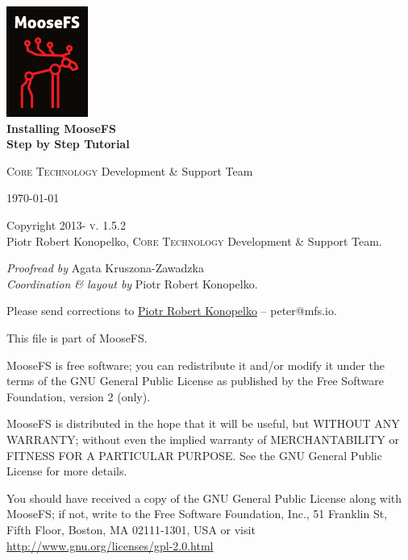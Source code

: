 \documentclass[a4paper,11pt,english]{report}
\newenvironment{copyrightnotice}
	{\begingroup
		\footnotesize
		\setlength{\parindent}{0pt}
		\setlength{\parskip}{\baselineskip}}
	{\endgroup}
\begin{document}
	
	\renewcommand{\labelitemi}{$\bullet$}
	\renewcommand{\labelitemii}{$\circ$}
	\renewcommand{\labelitemiii}{$\bullet$}
	\renewcommand{\labelitemiv}{$\circ$}
	
	\begin{titlepage}
		\begin{center}
			\includegraphics[width=0.2\textwidth]{images/moosefs.png}\\[1cm]
			
			{ \huge \bfseries Installing MooseFS \\
			Step by Step Tutorial \\[0.4cm] }
			

			\textsc{Core Technology} Development \& Support Team
			
			\vfill
			
			{\large \today}
		\end{center}
	\end{titlepage}
	
	
	\begin{copyrightnotice}
		\begin{flushleft}
			Copyright \textcopyright{} 2013-\the\year
			\hfill
			\textsc{v. 1.5.2}\\ %
			
			Piotr Robert Konopelko, \textsc{Core Technology} Development \& Support Team.
			
			\emph{Proofread by}
			Agata Kruszona-Zawadzka \\
			\emph{Coordination \& layout by} Piotr Robert Konopelko.
			
			Please send corrections to \href{mailto:peter@mfs.io}{Piotr Robert Konopelko} --  peter@mfs.io.
			
			\bigskip
			
			This file is part of MooseFS.
			
			MooseFS is free software; you can redistribute it and/or modify
			it under the terms of the GNU General Public License as published by
			the Free Software Foundation, version 2 (only).
			
			MooseFS is distributed in the hope that it will be useful,
			but WITHOUT ANY WARRANTY; without even the implied warranty of
			MERCHANTABILITY or FITNESS FOR A PARTICULAR PURPOSE. See the
			GNU General Public License for more details.
			
			You should have received a copy of the GNU General Public License
			along with MooseFS; if not, write to the Free Software
			Foundation, Inc., 51 Franklin St, Fifth Floor, Boston, MA 02111-1301, USA
			or visit \url{http://www.gnu.org/licenses/gpl-2.0.html}
		\end{flushleft}
	\end{copyrightnotice}
	
\end{document}
